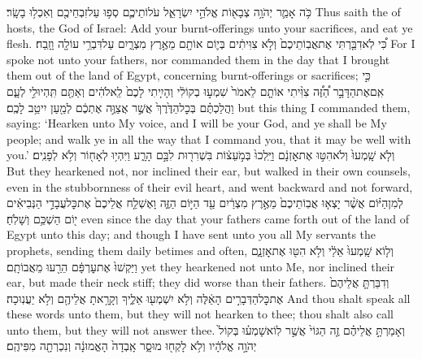 {כֹּ֥ה אָמַ֛ר יְהֹוָ֥ה צְבָא֖וֹת אֱלֹהֵ֣י יִשְׂרָאֵ֑ל עֹלוֹתֵיכֶ֛ם סְפ֥וּ עַל\maqqaf זִבְחֵיכֶ֖ם וְאִכְל֥וּ בָשָֽׂר׃}
{Thus saith the \lord\space of hosts, the God of Israel: Add your burnt-offerings unto your sacrifices, and eat ye flesh.}
{כִּ֠י לֹֽא\maqqaf דִבַּ֤רְתִּי אֶת\maqqaf אֲבֽוֹתֵיכֶם֙ וְלֹ֣א צִוִּיתִ֔ים בְּי֛וֹם  אוֹתָ֖ם מֵאֶ֣רֶץ מִצְרָ֑יִם עַל\maqqaf דִּבְרֵ֥י עוֹלָ֖ה וָזָֽבַח׃}
{For I spoke not unto your fathers, nor commanded them in the day that I brought them out of the land of Egypt, concerning burnt-offerings or sacrifices;}
{כִּ֣י אִֽם\maqqaf אֶת\maqqaf הַדָּבָ֣ר הַ֠זֶּ֠ה צִוִּ֨יתִי אוֹתָ֤ם לֵאמֹר֙ שִׁמְע֣וּ בְקוֹלִ֔י וְהָיִ֤יתִי לָכֶם֙ לֵֽאלֹהִ֔ים וְאַתֶּ֖ם תִּֽהְיוּ\maqqaf לִ֣י לְעָ֑ם וַהֲלַכְתֶּ֗ם בְּכׇל\maqqaf הַדֶּ֙רֶךְ֙ אֲשֶׁ֣ר אֲצַוֶּ֣ה אֶתְכֶ֔ם לְמַ֖עַן יִיטַ֥ב לָכֶֽם׃}
{but this thing I commanded them, saying: ‘Hearken unto My voice, and I will be your God, and ye shall be My people; and walk ye in all the way that I command you, that it may be well with you.’}
{וְלֹ֤א שָֽׁמְעוּ֙ וְלֹא\maqqaf הִטּ֣וּ אֶת\maqqaf אׇזְנָ֔ם וַיֵּֽלְכוּ֙ בְּמֹ֣עֵצ֔וֹת בִּשְׁרִר֖וּת לִבָּ֣ם הָרָ֑ע וַיִּהְי֥וּ לְאָח֖וֹר וְלֹ֥א לְפָנִֽים׃}
{But they hearkened not, nor inclined their ear, but walked in their own counsels, even in the stubbornness of their evil heart, and went backward and not forward,}
{לְמִן\maqqaf הַיּ֗וֹם אֲשֶׁ֨ר יָצְא֤וּ אֲבֽוֹתֵיכֶם֙ מֵאֶ֣רֶץ מִצְרַ֔יִם עַ֖ד הַיּ֣וֹם הַזֶּ֑ה וָאֶשְׁלַ֤ח אֲלֵיכֶם֙ אֶת\maqqaf כׇּל\maqqaf עֲבָדַ֣י הַנְּבִיאִ֔ים י֖וֹם הַשְׁכֵּ֥ם וְשָׁלֹֽחַ׃}
{even since the day that your fathers came forth out of the land of Egypt unto this day; and though I have sent unto you all My servants the prophets, sending them daily betimes and often,}
{וְל֤וֹא שָֽׁמְעוּ֙ אֵלַ֔י וְלֹ֥א הִטּ֖וּ אֶת\maqqaf אׇזְנָ֑ם וַיַּקְשׁוּ֙ אֶת\maqqaf עׇרְפָּ֔ם הֵרֵ֖עוּ מֵאֲבוֹתָֽם׃}
{yet they hearkened not unto Me, nor inclined their ear, but made their neck stiff; they did worse than their fathers.}
{וְדִבַּרְתָּ֤ אֲלֵיהֶם֙ אֶת\maqqaf כׇּל\maqqaf הַדְּבָרִ֣ים הָאֵ֔לֶּה וְלֹ֥א יִשְׁמְע֖וּ אֵלֶ֑יךָ וְקָרָ֥אתָ אֲלֵיהֶ֖ם וְלֹ֥א יַעֲנֽוּכָה׃}
{And thou shalt speak all these words unto them, but they will not hearken to thee; thou shalt also call unto them, but they will not answer thee.}
{וְאָמַרְתָּ֣ אֲלֵיהֶ֗ם זֶ֤ה הַגּוֹי֙ אֲשֶׁ֣ר לֽוֹא\maqqaf שָׁמְע֗וּ בְּקוֹל֙ יְהֹוָ֣ה אֱלֹהָ֔יו וְלֹ֥א לָקְח֖וּ מוּסָ֑ר אָֽבְדָה֙ הָאֱמוּנָ֔ה וְנִכְרְתָ֖ה מִפִּיהֶֽם׃ \setuma }
